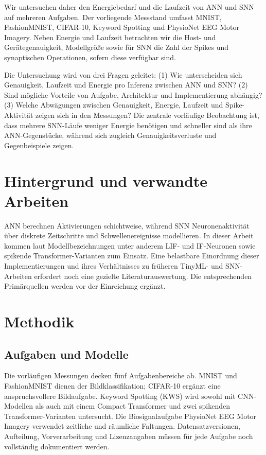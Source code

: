 \documentclass[11pt,a4paper]{article}
\begin{document}
Wir untersuchen daher den Energiebedarf und die Laufzeit von ANN und SNN auf mehreren Aufgaben. Der vorliegende Messstand umfasst MNIST, FashionMNIST, CIFAR-10, Keyword Spotting und PhysioNet EEG Motor Imagery. Neben Energie und Laufzeit betrachten wir die Host- und Gerätegenauigkeit, Modellgröße sowie für SNN die Zahl der Spikes und synaptischen Operationen, sofern diese verfügbar sind.

Die Untersuchung wird von drei Fragen geleitet: (1) Wie unterscheiden sich Genauigkeit, Laufzeit und Energie pro Inferenz zwischen ANN und SNN? (2) Sind mögliche Vorteile von Aufgabe, Architektur und Implementierung abhängig? (3) Welche Abwägungen zwischen Genauigkeit, Energie, Laufzeit und Spike-Aktivität zeigen sich in den Messungen? Die zentrale vorläufige Beobachtung ist, dass mehrere SNN-Läufe weniger Energie benötigen und schneller sind als ihre ANN-Gegenstücke, während sich zugleich Genauigkeitsverluste und Gegenbeispiele zeigen.

\section{Hintergrund und verwandte Arbeiten}
ANN berechnen Aktivierungen schichtweise, während SNN Neuronenaktivität über diskrete Zeitschritte und Schwellenereignisse modellieren. In dieser Arbeit kommen laut Modellbezeichnungen unter anderem LIF- und IF-Neuronen sowie spikende Transformer-Varianten zum Einsatz. Eine belastbare Einordnung dieser Implementierungen und ihres Verhältnisses zu früheren TinyML- und SNN-Arbeiten erfordert noch eine gezielte Literaturauswertung. Die entsprechenden Primärquellen werden vor der Einreichung ergänzt.

\section{Methodik}
\subsection{Aufgaben und Modelle}
Die vorläufigen Messungen decken fünf Aufgabenbereiche ab. MNIST und FashionMNIST dienen der Bildklassifikation; CIFAR-10 ergänzt eine anspruchsvollere Bildaufgabe. Keyword Spotting (KWS) wird sowohl mit CNN-Modellen als auch mit einem Compact Transformer und zwei spikenden Transformer-Varianten untersucht. Die Biosignalaufgabe PhysioNet EEG Motor Imagery verwendet zeitliche und räumliche Faltungen. Datensatzversionen, Aufteilung, Vorverarbeitung und Lizenzangaben müssen für jede Aufgabe noch vollständig dokumentiert werden.
\end{document}
